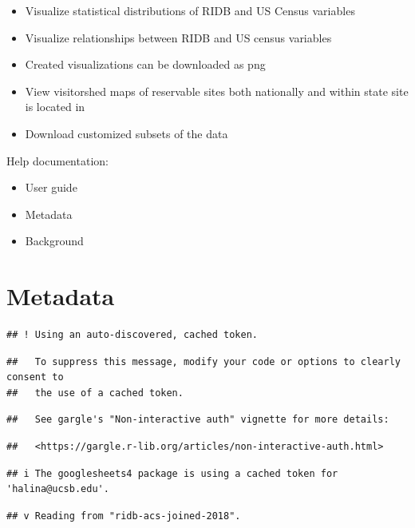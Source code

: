 \documentclass[
]{book}
\providecommand{\tightlist}{%
  \setlength{\itemsep}{0pt}\setlength{\parskip}{0pt}}
\begin{document}
\begin{itemize}
\tightlist
\item
  Visualize statistical distributions of RIDB and US Census variables
\item
  Visualize relationships between RIDB and US census variables
\item
  Created visualizations can be downloaded as png
\item
  View visitorshed maps of reservable sites both nationally and within state site is located in
\item
  Download customized subsets of the data
\end{itemize}

Help documentation:

\begin{itemize}
\tightlist
\item
  User guide
\item
  Metadata
\item
  Background
\end{itemize}

\hypertarget{metadata}{%
\section{Metadata}\label{metadata}}

\begin{verbatim}
## ! Using an auto-discovered, cached token.
\end{verbatim}

\begin{verbatim}
##   To suppress this message, modify your code or options to clearly consent to
##   the use of a cached token.
\end{verbatim}

\begin{verbatim}
##   See gargle's "Non-interactive auth" vignette for more details:
\end{verbatim}

\begin{verbatim}
##   <https://gargle.r-lib.org/articles/non-interactive-auth.html>
\end{verbatim}

\begin{verbatim}
## i The googlesheets4 package is using a cached token for 'halina@ucsb.edu'.
\end{verbatim}

\begin{verbatim}
## v Reading from "ridb-acs-joined-2018".
\end{verbatim}
\end{document}
